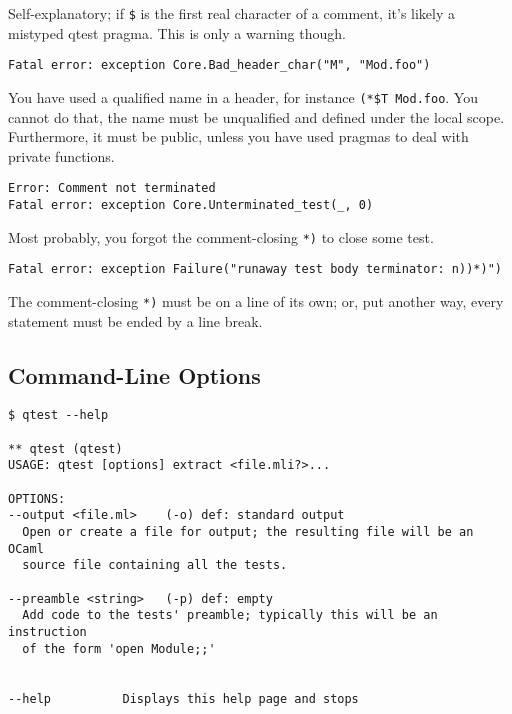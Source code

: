 \documentclass[a4paper,12pt]{article}
\begin{document}
Self-explanatory; if \texttt{\$} is the first real character of a comment, it's likely a mistyped
qtest pragma. This is only a warning though.

\begin{verbatim}
Fatal error: exception Core.Bad_header_char("M", "Mod.foo")
\end{verbatim}

You have used a qualified name in a header, for instance \texttt{(*\$T Mod.foo}. You cannot do
that, the name must be unqualified and defined under the local scope. Furthermore, it must
be public, unless you have used pragmas to deal with private functions.

\begin{verbatim}
Error: Comment not terminated
Fatal error: exception Core.Unterminated_test(_, 0)
\end{verbatim}

Most probably, you forgot the comment-closing \texttt{*)} to close some test.

\begin{verbatim}
Fatal error: exception Failure("runaway test body terminator: n))*)")
\end{verbatim}

The comment-closing \texttt{*)} must be on a line of its own; or, put another way, every
statement must be ended by a line break.

\subsection{\qtest{} Command-Line Options}

\begin{verbatim}
$ qtest --help

** qtest (qtest)
USAGE: qtest [options] extract <file.mli?>...

OPTIONS:
--output <file.ml>    (-o) def: standard output
  Open or create a file for output; the resulting file will be an OCaml
  source file containing all the tests.

--preamble <string>   (-p) def: empty
  Add code to the tests' preamble; typically this will be an instruction
  of the form 'open Module;;'


--help          Displays this help page and stops
\end{verbatim} 
\end{document}
